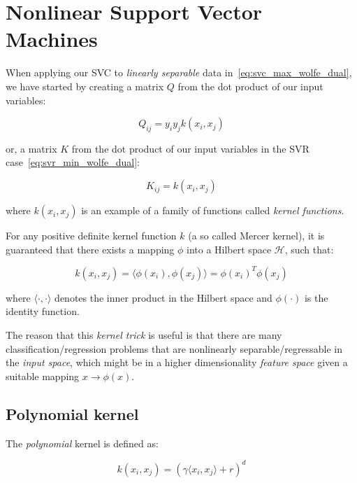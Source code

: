 \section{Nonlinear Support Vector Machines}

When applying our SVC to \emph{linearly separable} data in~\eqref{eq:svc_max_wolfe_dual}, we have started by creating a matrix $Q$ from the dot product of our input variables:

\begin{equation} \label{eq:svc_hessian}
	Q_{ij} = y_i y_j k(x_i,x_j)
\end{equation}

or, a matrix $K$ from the dot product of our input variables in the SVR case~\eqref{eq:svr_min_wolfe_dual}:

\begin{equation} \label{eq:svr_hessian}
	K_{ij} = k(x_i,x_j)
\end{equation}

where $k(x_i,x_j)$ is an example of a family of functions called \emph{kernel functions}.

For any positive definite kernel function $k$ (a so called Mercer kernel), it is guaranteed that there exists a mapping $\phi$ into a Hilbert space $\mathcal{H}$, such that:

\begin{equation} \label{eq:kernel_function}
	k(x_i,x_j) = \langle \phi(x_i), \phi(x_j) \rangle = \phi(x_i)^T \phi(x_j)
\end{equation}

where $\langle \cdot, \cdot \rangle$ denotes the inner product in the Hilbert space and $\phi(\cdot)$ is the identity function.

The reason that this \emph{kernel trick} is useful is that there are many classification/regression problems that are nonlinearly separable/regressable in the \emph{input space}, which might be in a higher dimensionality \emph{feature space} given a suitable mapping $x \rightarrow \phi(x)$.

\subsection{Polynomial kernel}

The \emph{polynomial} kernel is defined as:

\begin{equation} \label{eq:poly_kernel}
	k(x_i,x_j)=(\gamma \langle x_i, x_j\rangle + r)^d
\end{equation}

